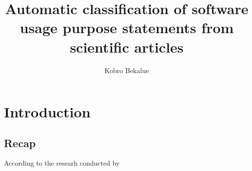 \documentclass[12pt, a4paper]{article}
\author{Kobro Bekalue}
\title{Automatic classification of software usage purpose statements from scientific articles}
\begin{document}

\maketitle


\clearpage

\section{Introduction}

\subsection{Recap}

According to the researh conducted by \cite{}
\end{document}
